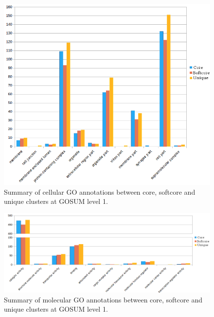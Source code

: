 \documentclass[12pt]{article}
\begin{document}
\begin{figure} 
\includegraphics[scale=.8]{3Aug18_cluster-investigation/figures/gosum-pan/Pan-gosum1-cell-split.png} 
\caption{Summary of cellular GO annotations between core, softcore and unique clusters at GOSUM level 1.} 
\label{fig:PanGo1Cell}
\end{figure} 


\begin{figure} 
\includegraphics[scale=.6]{3Aug18_cluster-investigation/figures/gosum-pan/Pan-gosum1-molec-split.png} 
\caption{Summary of molecular GO annotations between core, softcore and unique clusters at GOSUM level 1.} 
\label{fig:PanGo1Molec}
\end{figure} 



\FloatBarrier
\end{document}

